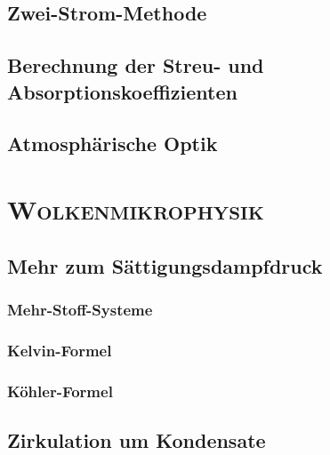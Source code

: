 \documentclass{book}
\begin{document}
\section{Zwei-Strom-Methode}
\label{sec:zwei-strom-methode}

\section{Berechnung der Streu- und Absorptionskoeffizienten}
\label{sec:berechnung_der_streu-_und_absorptionskoeffizienten}

\section{Atmosphärische Optik}
\label{sec:atmosphaerische_optik}

\chapter{\normalfont\textsc{Wolkenmikrophysik}}
\label{chap:wolkenmikrophysik}

\section{Mehr zum Sättigungsdampfdruck}
\label{sec:mehr_zum_sättigungsdampfdruck}

\subsection{Mehr-Stoff-Systeme}
\label{sec:mehr-stoff-systeme}

\subsection{Kelvin-Formel}
\label{sec:kelvin-formal}

\subsection{Köhler-Formel}
\label{sec:köhler-formel}

\section{Zirkulation um Kondensate}
\label{sec:zirkulation_um_kondensate}
\end{document}
